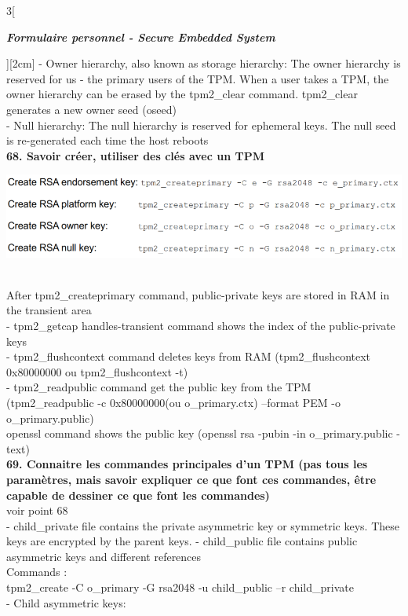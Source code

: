 \begin{multicols}{3}[\centerline{ \large\em \textbf{Formulaire personnel - Secure Embedded System}}][2cm]
- Owner hierarchy, also known as storage hierarchy: The owner hierarchy is reserved for us - the primary users of the TPM. When a user takes a TPM, the owner hierarchy can be erased by the tpm2\_clear command. tpm2\_clear generates a new owner seed (oseed)\\
- Null hierarchy: The null hierarchy is reserved for ephemeral keys. The null seed is re-generated each time the host reboots
\\ \textbf{68. Savoir créer, utiliser des clés avec un TPM\\}
\begin{minipage}{\linewidth}
	\centering
    \includegraphics[width =0.8\columnwidth]{images/48.png}
\end{minipage}\\
After tpm2\_createprimary command, public-private keys are stored in RAM in the transient area\\
- tpm2\_getcap handles-transient command shows the index of the public-private keys\\
- tpm2\_flushcontext command deletes keys from RAM (tpm2\_flushcontext 0x80000000 ou tpm2\_flushcontext -t)\\
- tpm2\_readpublic command get the public key from the TPM (tpm2\_readpublic -c 0x80000000(ou o\_primary.ctx) --format PEM -o o\_primary.public)\\
openssl command shows the public key (openssl rsa -pubin -in o\_primary.public -text)\\
\textbf{69. Connaitre les commandes principales d’un TPM (pas tous les paramètres, mais savoir expliquer ce que font ces commandes, être capable de dessiner ce que font les commandes)\\}
voir point 68\\
- child\_private file contains the private asymmetric key or symmetric keys. These keys are encrypted by the parent keys. 
- child\_public file contains public asymmetric keys and different references\\
Commands :\\
tpm2\_create -C o\_primary -G rsa2048 -u child\_public –r child\_private\\
- Child asymmetric keys:\\
\begin{minipage}{\linewidth}

\end{minipage}
\end{multicols}
